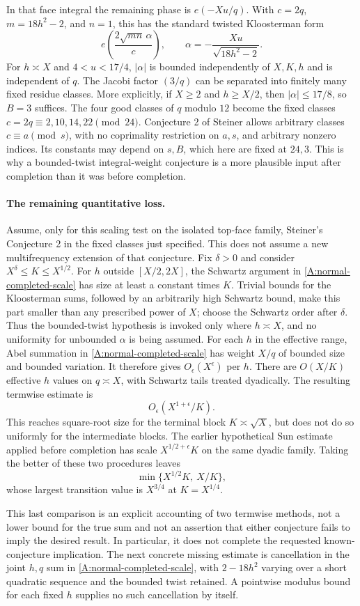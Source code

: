 In that face integral the remaining phase is $e(-Xu/q)$.
With $c=2q$, $m=18h^2-2$, and $n=1$, this has the standard
twisted Kloosterman form
\[
 e\!\left(\frac{2\sqrt{mn}\,\alpha}{c}\right),
 \qquad \alpha=-\frac{Xu}{\sqrt{18h^2-2}}.
\]
For $h\asymp X$ and $4<u<17/4$, $|\alpha|$ is bounded
independently of $X,K,h$ and is independent of $q$.
The Jacobi factor $(3/q)$ can be separated into finitely
many fixed residue classes. More explicitly, if $X\geq2$ and
$h\geq X/2$, then $|\alpha|\leq17/8$, so $B=3$ suffices.
The four good classes of $q$ modulo $12$ become the fixed
classes $c=2q\equiv2,10,14,22\pmod{24}$.
Conjecture 2 of Steiner \cite{A5Steiner2019} allows arbitrary
classes $c\equiv a\pmod{s}$, with no coprimality restriction
on $a,s$, and arbitrary nonzero indices. Its constants may
depend on $s,B$, which here are fixed at $24,3$.
This is why a bounded-twist
integral-weight conjecture is a more plausible input after
completion than it was before completion.

\paragraph{The remaining quantitative loss.}
Assume, only for this scaling test on the isolated top-face
family, Steiner's Conjecture 2 in the fixed classes just
specified. This does not assume a new multifrequency
extension of that conjecture.
Fix $\delta>0$ and consider $X^\delta\leq K\leq X^{1/2}$.
For $h$ outside $[X/2,2X]$, the Schwartz argument in
\eqref{A:normal-completed-scale} has size at least a
constant times $K$. Trivial bounds for the Kloosterman
sums, followed by an arbitrarily high Schwartz bound,
make this part smaller than any prescribed power of
$X$; choose the Schwartz order after $\delta$.
Thus the bounded-twist hypothesis is invoked only
where $h\asymp X$, and no uniformity for unbounded
$\alpha$ is being assumed.
For each $h$ in the effective range, Abel summation in
\eqref{A:normal-completed-scale} has weight $X/q$ of
bounded size and bounded variation. It therefore gives
$O_\epsilon(X^\epsilon)$ per $h$.
There are $O(X/K)$ effective $h$ values on $q\asymp X$,
with Schwartz tails treated dyadically. The resulting
termwise estimate is
\[
 O_\epsilon(X^{1+\epsilon}/K).
\]
This reaches square-root size for the terminal block
$K\asymp\sqrt X$, but does not do so uniformly for the
intermediate blocks.
The earlier hypothetical Sun estimate applied before
completion has scale $X^{1/2+\epsilon}K$ on the same
dyadic family. Taking the better of these two procedures
leaves
\[
 \min\{X^{1/2}K,\ X/K\},
\]
whose largest transition value is $X^{3/4}$ at
$K=X^{1/4}$.

This last comparison is an explicit accounting of two
termwise methods, not a lower bound for the true sum and
not an assertion that either conjecture fails to imply
the desired result. In particular, it does not complete
the requested known-conjecture implication. The next
concrete missing estimate is cancellation in the joint
$h,q$ sum in \eqref{A:normal-completed-scale}, with
$2-18h^2$ varying over a short quadratic sequence and
the bounded twist retained. A pointwise modulus bound
for each fixed $h$ supplies no such cancellation by
itself.
